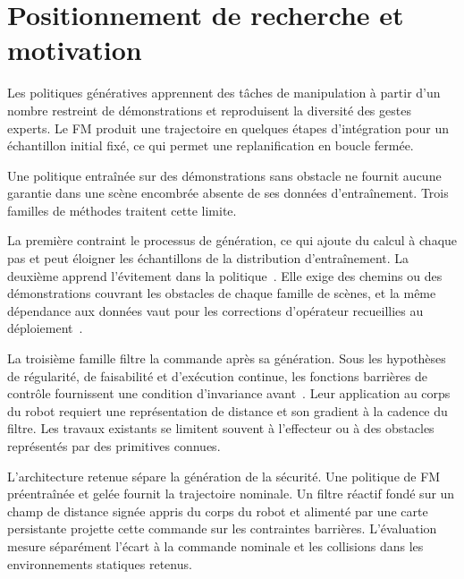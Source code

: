 \label{sec:Metho}

\section{Positionnement de recherche et motivation}
Les politiques génératives apprennent des tâches de manipulation à partir d'un nombre restreint de démonstrations et reproduisent la diversité des gestes experts. Le \ac{FM} produit une trajectoire en quelques étapes d'intégration pour un échantillon initial fixé, ce qui permet une replanification en boucle fermée.

Une politique entraînée sur des démonstrations sans obstacle ne fournit aucune garantie dans une scène encombrée absente de ses données d'entraînement. Trois familles de méthodes traitent cette limite.

La première contraint le processus de génération, ce qui ajoute du calcul à chaque pas et peut éloigner les échantillons de la distribution d'entraînement. La deuxième apprend l'évitement dans la politique~\cite{Soleymanzadeh2026Flow,Ding2025Towards}. Elle exige des chemins ou des démonstrations couvrant les obstacles de chaque famille de scènes, et la même dépendance aux données vaut pour les corrections d'opérateur recueillies au déploiement~\cite{Welte2026Flowcorrect}.

La troisième famille filtre la commande après sa génération. Sous les hypothèses de régularité, de faisabilité et d'exécution continue, les fonctions barrières de contrôle fournissent une condition d'invariance avant~\cite{Ames2019Control}. Leur application au corps du robot requiert une représentation de distance et son gradient à la cadence du filtre. Les travaux existants se limitent souvent à l'effecteur ou à des obstacles représentés par des primitives connues.

L'architecture retenue sépare la génération de la sécurité. Une politique de \ac{FM} préentraînée et gelée fournit la trajectoire nominale. Un filtre réactif fondé sur un champ de distance signée appris du corps du robot et alimenté par une carte persistante projette cette commande sur les contraintes barrières. L'évaluation mesure séparément l'écart à la commande nominale et les collisions dans les environnements statiques retenus.

